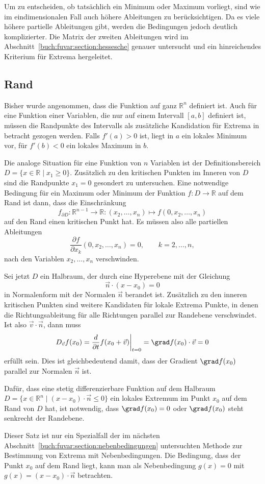 Um zu entscheiden, ob tatsächlich ein Minimum oder Maximum vorliegt,
sind wie im eindimensionalen Fall auch höhere Ableitungen zu berücksichtigen.
Da es viele höhere partielle Ableitungen gibt, werden die Bedingungen
jedoch deutlich komplizierter.
Die Matrix der zweiten Ableitungen wird im
Abschnitt~\ref{buch:fuvar:section:hessesche} genauer untersucht 
und ein hinreichendes Kriterium für Extrema hergeleitet.

%
%
\subsection{Rand}
Bisher wurde angenommen, dass die Funktion auf ganz $\mathbb{R}^n$
definiert ist.
Auch für eine Funktion einer Variablen, die nur auf einem Intervall
$[a,b]$ definiert ist, müssen die Randpunkte des Intervalls als
zusätzliche Kandidation für Extrema in betracht gezogen werden.
Falls $f'(a)>0$ ist, liegt in $a$ ein lokales Minimum vor, für
$f'(b)<0$ ein lokales Maximum in $b$.

Die analoge Situation für eine Funktion von $n$ Variablen ist der
Definitionsbereich $D=\{x\in \mathbb{R}\mid x_1\ge 0\}$.
Zusätzlich zu den kritischen Punkten im Inneren von $D$ sind die
Randpunkte $x_1=0$ gesondert zu untersuchen.
Eine notwendige Bedingung für ein Maximum oder Minimum der Funktion
$f\colon D\to\mathbb{R}$ auf dem Rand ist dann, dass die Einschränkung
\[
f_{\partial D}
\colon
\mathbb{R}^{n-1}\to \mathbb{R}
:
(x_2,\dots,x_n)\mapsto f(0,x_2,\dots,x_n)
\]
auf den Rand einen kritischen Punkt hat.
Es müssen also alle partiellen Ableitungen
\[
\frac{\partial f}{\partial x_k}(0,x_2,\dots,x_n)
=
0,\qquad k=2,\dots,n,
\]
nach den Variablen
$x_2,\dots,x_n$ verschwinden.

Sei jetzt $D$ ein Halbraum, der durch eine Hyperebene mit der Gleichung
\[
\vec{n}\cdot (x-x_0) = 0
\]
in Normalenform mit der Normalen $\vec{n}$ berandet ist.
Zusätzlich zu den inneren kritischen Punkten sind weitere Kandidaten
für lokale Extrema Punkte, in denen die Richtungsableitung für alle
Richtungen parallel zur Randebene verschwindet.
Ist also $\vec{v}\cdot \vec{n}$, dann muss
\[
D_{\vec{v}} f(x_0)
=
\frac{d}{\partial t}f(x_0+\vec{v})\bigg|_{t=0}
=
\grad f(x_0)\cdot \vec{v}
=
0
\]
erfüllt sein.
Dies ist gleichbedeutend damit, dass der Gradient $\grad f(x_0)$ parallel
zur Normalen $\vec{n}$ ist.

\begin{satz}
Dafür, dass eine stetig differenzierbare Funktion auf dem Halbraum
$D=\{x\in\mathbb{R}^n\mid (x-x_0)\cdot\vec{n}\le 0\}$ ein lokales 
Extremum im Punkt $x_0$ auf dem Rand von $D$ hat, ist notwendig,
dass $\grad f(x_0)=0$ oder $\grad f(x_0)$ steht senkrecht der Randebene.
\end{satz}

Dieser Satz ist nur ein Spezialfall der im nächsten
Abschnitt~\ref{buch:fuvar:section:nebenbedingungen}
untersuchten Methode zur Bestimmung von Extrema mit Nebenbedingungen.
Die Bedingung, dass der Punkt $x_0$ auf dem Rand liegt, kann man
als Nebenbedingung $g(x) = 0$ mit $g(x)=(x-x_0)\cdot\vec{n}$ betrachten.

